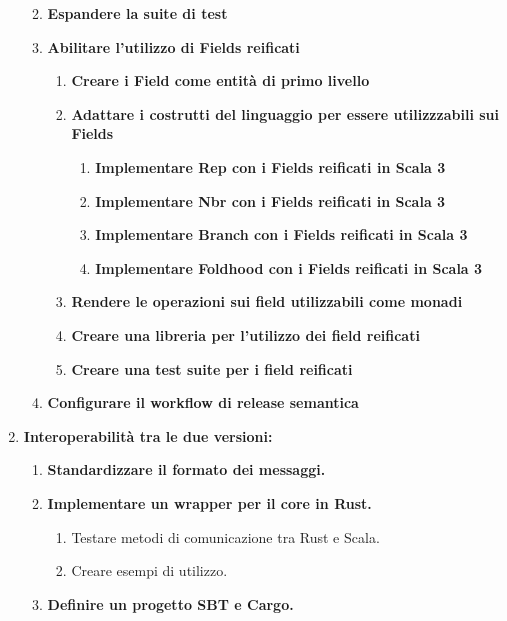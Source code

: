\documentclass[12pt, a4paper]{article}
\begin{document}
\begin{enumerate}
\begin{enumerate}
\begin{enumerate}
                    \end{enumerate}
              \item \textbf{Espandere la suite di test}
                    \color{blue}
              \item \textbf{Abilitare l'utilizzo di Fields reificati}
                    \begin{enumerate}
                        \item \textbf{Creare i Field come entità di primo livello}
                        \item \textbf{Adattare i costrutti del linguaggio per essere utilizzzabili sui Fields}
                              \begin{enumerate}
                                  \item \textbf{Implementare Rep con i Fields reificati in Scala 3}
                                  \item \textbf{Implementare Nbr con i Fields reificati in Scala 3}
                                  \item \textbf{Implementare Branch con i Fields reificati in Scala 3}
                                  \item \textbf{Implementare Foldhood con i Fields reificati in Scala 3}
                              \end{enumerate}
                        \item \textbf{Rendere le operazioni sui field utilizzabili come monadi}
                        \item \textbf{Creare una libreria per l'utilizzo dei field reificati}
                        \item \textbf{Creare una test suite per i field reificati}
                    \end{enumerate}
                    \color{cyan}
              \item \textbf{Configurare il workflow di release semantica}

          \end{enumerate}

          \color{magenta}
    \item \textbf{Interoperabilità tra le due versioni:}
          \begin{enumerate}
              \item \textbf{Standardizzare il formato dei messaggi.}
              \item \textbf{Implementare un wrapper per il core in Rust.}
                    \begin{enumerate}
                        \item Testare metodi di comunicazione tra Rust e Scala.
                        \item Creare esempi di utilizzo.
                    \end{enumerate}
              \item \textbf{Definire un progetto SBT e Cargo.}
          \end{enumerate}
\end{enumerate}
\end{document}
